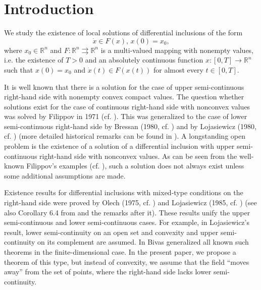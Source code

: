 \documentclass[a4paper]{article}
\begin{document}
\section{Introduction}

We study the existence of local solutions of differential inclusions of the form $$\dot{x} \in F(x),\, x(0)=x_0,$$ where $x_0 \in \mathbb{R}^n$ and $F : \mathbb{R}^n \rightrightarrows \mathbb{R}^n$ is a multi-valued mapping with nonempty values, i.e. the existence of $T > 0$ and an absolutely continuous function $x: [0,T] \to \mathbb{R}^n$ such that $x(0)=x_0$ and $\dot{x}(t) \in F(x(t))$ for almost every $t \in [0,T]$.

It is well known that there is a solution for the case of upper semi-continuous right-hand side with nonempty convex compact values. The question whether solutions exist for the case of continuous right-hand side with nonconvex
values was solved by Filippov in 1971 (cf. \cite{F}). This was generalized to
the case of lower semi-continuous right-hand side by Bressan (1980, cf. \cite{B}) and by Lojasiewicz (1980, cf. \cite{L0}) (more detailed historical remarks can be found in \cite{D}). A longstanding open problem is the existence of a solution of a differential inclusion with upper semi-continuous right-hand side with nonconvex values. As can be seen from the well-known Filippov's examples (cf. \cite{D}), such a solution does not always exist unless some additional assumptions are made.

Existence results for differential inclusions with mixed-type conditions on the right-hand side were proved by Olech (1975, cf. \cite{O}) and Lojasiewicz (1985, cf. \cite{L}) (see also Corollary 6.4 from \cite{D} and the remarks after it). These results unify the upper semi-continuous and lower semi-continuous cases. For example, in Lojasiewicz's result, lower semi-continuity on an open set and convexity and upper semi-continuity on its complement are assumed. In \cite{Bivas} Bivas generalized all known such theorems in the finite-dimensional case. In the present paper, we propose a theorem of this type, but instead of convexity, we assume that the field ``moves away'' from the set of points, where the right-hand side lacks lower semi-continuity.  
\end{document}
